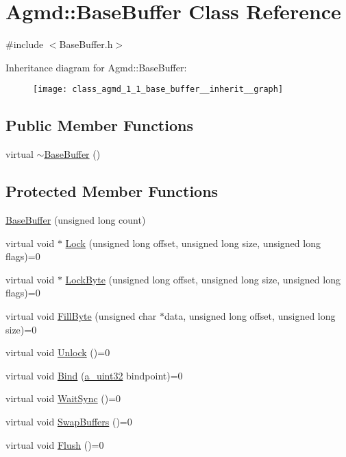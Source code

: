 \hypertarget{class_agmd_1_1_base_buffer}{\section{Agmd\+:\+:Base\+Buffer Class Reference}
\label{class_agmd_1_1_base_buffer}
}


{\ttfamily \#include $<$Base\+Buffer.\+h$>$}



Inheritance diagram for Agmd\+:\+:Base\+Buffer\+:\nopagebreak
\begin{figure}[H]
\begin{center}
\leavevmode
\texttt{[image: class\_agmd\_1\_1\_base\_buffer\_\_inherit\_\_graph]}
\end{center}
\end{figure}
\subsection*{Public Member Functions}
\begin{DoxyCompactItemize}
\item 
virtual \hyperlink{class_agmd_1_1_base_buffer_ab69957780fa17eef7da0915c3f12ec77}{$\sim$\+Base\+Buffer} ()
\end{DoxyCompactItemize}
\subsection*{Protected Member Functions}
\begin{DoxyCompactItemize}
\item 
\hyperlink{class_agmd_1_1_base_buffer_ab2e642026d9013d84dba26248a09e3c5}{Base\+Buffer} (unsigned long count)
\item 
virtual void $\ast$ \hyperlink{class_agmd_1_1_base_buffer_ab3c4e881ef20a8d6d9f8d3f2d920a60e}{Lock} (unsigned long offset, unsigned long size, unsigned long flags)=0
\item 
virtual void $\ast$ \hyperlink{class_agmd_1_1_base_buffer_a0523f6a4bebacc8800d91297d20b12ca}{Lock\+Byte} (unsigned long offset, unsigned long size, unsigned long flags)=0
\item 
virtual void \hyperlink{class_agmd_1_1_base_buffer_a7bf279e968311e91e905afd7d7e2c145}{Fill\+Byte} (unsigned char $\ast$data, unsigned long offset, unsigned long size)=0
\item 
virtual void \hyperlink{class_agmd_1_1_base_buffer_afb2c7043048c1327a1b1cef6644f1878}{Unlock} ()=0
\item 
virtual void \hyperlink{class_agmd_1_1_base_buffer_a8da8efb40a86c4c48e1b9bca64de6f92}{Bind} (\hyperlink{_common_defines_8h_a964296f9770051b9e4807b1f180dd416}{a\+\_\+uint32} bindpoint)=0
\item 
virtual void \hyperlink{class_agmd_1_1_base_buffer_a9d694ef2b76825d6e496d35a2d6def6b}{Wait\+Sync} ()=0
\item 
virtual void \hyperlink{class_agmd_1_1_base_buffer_a5d698e89b12501c71dfea9f7575b3742}{Swap\+Buffers} ()=0
\item 
virtual void \hyperlink{class_agmd_1_1_base_buffer_ad4922f6545124baec94ce4bd9b4ccceb}{Flush} ()=0
\end{DoxyCompactItemize}
